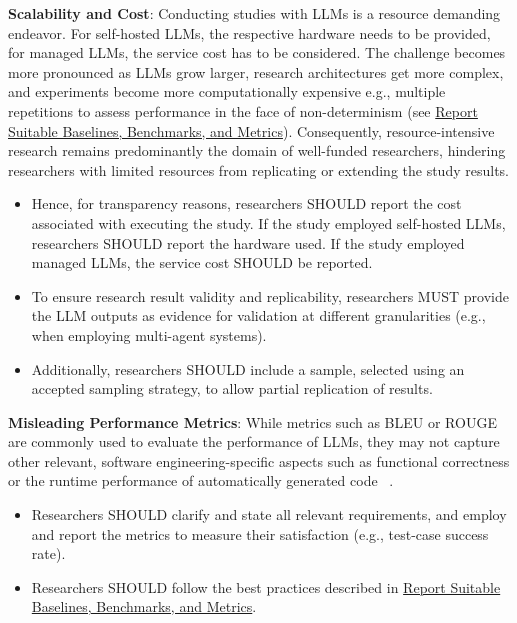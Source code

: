 \textbf{Scalability and Cost}:
Conducting studies with LLMs is a resource demanding endeavor. For self-hosted LLMs, the respective hardware needs to be provided, for managed LLMs, the service cost has to be considered. The challenge becomes more pronounced as LLMs grow larger, research architectures get more complex, and experiments become more computationally expensive e.g., multiple repetitions to assess performance in the face of non-determinism (see \href{/guidelines/report-baselines-benchmarks-and-metrics}{Report Suitable Baselines, Benchmarks, and Metrics}).
Consequently, resource-intensive research remains predominantly the domain of well-funded researchers, hindering researchers with limited resources from replicating or extending the study results.
\begin{itemize}
  \item Hence, for transparency reasons, researchers SHOULD report the cost associated with executing the study. If the study employed self-hosted LLMs, researchers SHOULD report the hardware used. If the study employed managed LLMs, the service cost SHOULD be reported.
  \item To ensure research result validity and replicability, researchers MUST provide the LLM outputs as evidence for validation at different granularities (e.g., when employing multi-agent systems). 
  \item Additionally, researchers SHOULD include a sample, selected using an accepted sampling strategy, to allow partial replication of results.
\end{itemize}

\textbf{Misleading Performance Metrics}:
While metrics such as BLEU or ROUGE are commonly used to evaluate the performance of LLMs, they may not capture other relevant, software engineering-specific aspects such as functional correctness or the runtime performance of automatically generated code ~\cite{DBLP:conf/nips/LiuXW023}.
\begin{itemize}
  \item Researchers SHOULD clarify and state all relevant requirements, and employ and report the metrics to measure their satisfaction (e.g., test-case success rate). 
  \item Researchers SHOULD follow the best practices described in \href{/guidelines/report-baselines-benchmarks-and-metrics}{Report Suitable Baselines, Benchmarks, and Metrics}.
\end{itemize}

